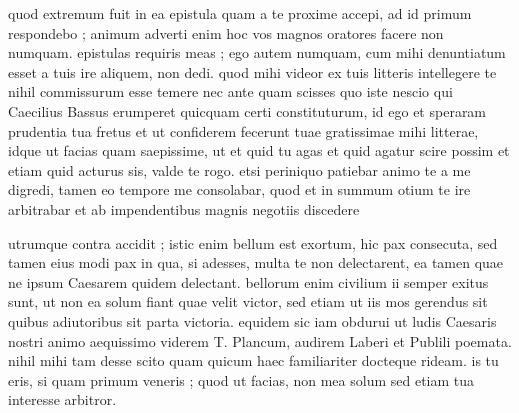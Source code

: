 


 quod extremum fuit in ea epistula quam a te proxime accepi, ad id primum respondebo ; animum adverti enim hoc vos magnos oratores facere non numquam. epistulas requiris meas ; ego autem numquam, cum mihi denuntiatum esset a tuis ire aliquem, non dedi. quod mihi videor ex tuis litteris intellegere te nihil commissurum esse temere nec ante quam scisses quo iste nescio qui Caecilius Bassus erumperet quicquam certi constituturum, id ego et speraram prudentia tua fretus et ut confiderem fecerunt tuae gratissimae mihi litterae, idque ut facias quam saepissime, ut et quid tu agas et quid agatur scire possim et etiam quid acturus sis, valde te rogo. etsi periniquo patiebar animo te a me digredi, tamen eo tempore me consolabar, quod et in summum otium te ire arbitrabar et ab impendentibus magnis negotiis discedere

 utrumque contra accidit ; istic enim bellum est exortum, hic pax consecuta, sed tamen eius modi pax in qua, si adesses, multa te non delectarent, ea tamen quae ne ipsum Caesarem quidem delectant. bellorum enim civilium ii semper exitus sunt, ut non ea solum fiant quae velit victor, sed etiam ut iis mos gerendus sit quibus adiutoribus sit parta victoria. equidem sic iam obdurui ut ludis Caesaris nostri animo aequissimo viderem T. Plancum, audirem Laberi et Publili poemata. nihil mihi tam desse scito quam quicum haec familiariter docteque rideam. is tu eris, si quam primum veneris ; quod ut facias, non mea solum sed etiam tua interesse arbitror.
